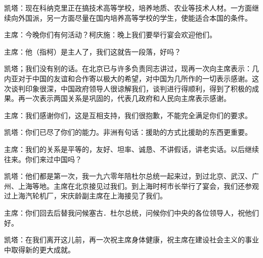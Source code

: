 凯塔：现在科纳克里正在搞技术高等学校，培养地质、农业等技术人材。一方面继续向外国派，另一方面尽量在国内培养高等学校的学生，使能适合本国的条件。

主席：今晚你们有何活动？柯庆施：晚上我们要举行宴会欢迎他们。

主席：他（指柯）是主人了，我们这就告一段落，好吗？

凯塔；我们没有别的话。在北京已与许多负责同志讲过，现再一次向主席表示：几内亚对于中国的友谊和合作寄以极大的希望，对中国为几所作的一切表示感谢。这次谈判印象很深，中国政府领导人很谅解我们，谈判进行得顺利，得到了积极的成果。再一次表示两国关系是巩固的，代表几政府和人民向主席表示感谢。

主席：我们感谢你们，这是互相支持，我们很抱歉，不能完全满足你们的要求。

凯塔：你们已尽了你们的能力。非洲有句话：援助的方式比援助的东西更重要。

主席：我们的关系是平等的，友好、坦率、诚恳、不讲假话，讲老实话。以后继续往来。你们来过中国吗？

凯塔：他们都是第一次，我一九六零年陪杜尔总统一起来过，到过北京、武汉、广州、上海等地。主席在北京接见过我们。到上海时柯市长举行了宴会，我们还参观过上海汽轮机厂，宋庆龄副主席在上海接见了我们。

主席：你们回去后替我问候塞古．杜尔总统，问候你们中央的各位领导人，祝他们好。

凯塔：在我们离开这儿前，再一次祝主席身体健康，祝主席在建设社会主义的事业中取得新的更大成就。



